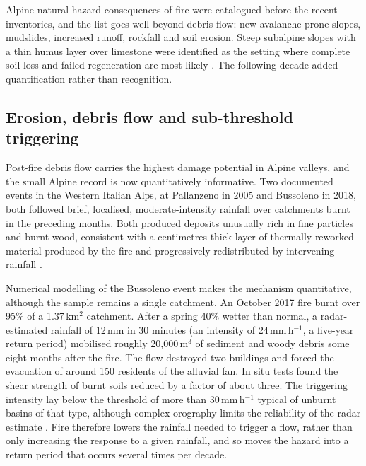 \documentclass[11pt,a4paper]{article}
\begin{document}
Alpine natural-hazard consequences of fire were catalogued before the recent inventories, and the list goes well beyond debris flow: new avalanche-prone slopes, mudslides, increased runoff, rockfall and soil erosion. Steep subalpine slopes with a thin humus layer over limestone were identified as the setting where complete soil loss and failed regeneration are most likely \citep{muller_forest_2020}. The following decade added quantification rather than recognition.

\subsection{Erosion, debris flow and sub-threshold triggering}

Post-fire debris flow carries the highest damage potential in Alpine valleys, and the small Alpine record is now quantitatively informative. Two documented events in the Western Italian Alps, at Pallanzeno in 2005 and Bussoleno in 2018, both followed brief, localised, moderate-intensity rainfall over catchments burnt in the preceding months. Both produced deposits unusually rich in fine particles and burnt wood, consistent with a centimetres-thick layer of thermally reworked material produced by the fire and progressively redistributed by intervening rainfall \citep{tiranti_wildfires_2021}.

Numerical modelling of the Bussoleno event makes the mechanism quantitative, although the sample remains a single catchment. An October 2017 fire burnt over 95\% of a 1.37\,km$^2$ catchment. After a spring 40\% wetter than normal, a radar-estimated rainfall of 12\,mm in 30 minutes (an intensity of 24\,mm\,h$^{-1}$, a five-year return period) mobilised roughly 20{,}000\,m$^3$ of sediment and woody debris some eight months after the fire. The flow destroyed two buildings and forced the evacuation of around 150 residents of the alluvial fan. In situ tests found the shear strength of burnt soils reduced by a factor of about three. The triggering intensity lay below the threshold of more than 30\,mm\,h$^{-1}$ typical of unburnt basins of that type, although complex orography limits the reliability of the radar estimate \citep{laporta_postwildfire_2025}. Fire therefore lowers the rainfall needed to trigger a flow, rather than only increasing the response to a given rainfall, and so moves the hazard into a return period that occurs several times per decade.
\end{document}
